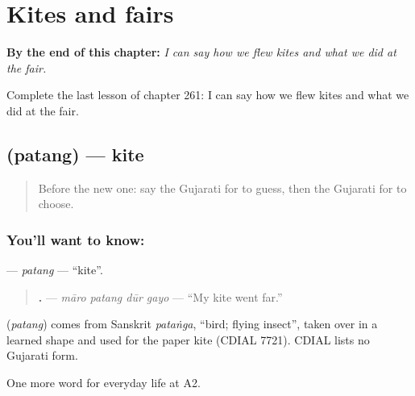 
\chapter{Kites and fairs}
\label{ch:gu-kites-and-fairs}

\begin{chapteropening}
\textbf{By the end of this chapter:} \emph{I can say how we flew kites and what we did at the fair.}

Complete the last lesson of chapter 261: I can say how we flew kites and what we did at the fair.
\end{chapteropening}

\section[\texorpdfstring{\gu{પતંગ} (patang)}{પતંગ (patang)}]{ (patang) — kite}

\label{lesson:GU-C261-patang}



\begin{quote}
Before the new one: say the Gujarati for to guess, then the Gujarati for to choose.
\end{quote}

\subsection*{You'll want to know: }
\textbf{} — \emph{patang} — \textquotedblleft{}kite\textquotedblright{}.

\begin{quote}
\textbf{   .} — \emph{māro patang dūr gayo} — \textquotedblleft{}My kite went far.\textquotedblright{}
\end{quote}

\begin{cousinweb}
\textbf{} (\emph{patang}) comes from Sanskrit \emph{pataṅga}, \textquotedblleft{}bird; flying insect\textquotedblright{}, taken over in a learned shape and used for the paper kite (CDIAL 7721). CDIAL lists no Gujarati form.
\end{cousinweb}

\begin{grammarlens}[title={What you've built}]
One more word for everyday life at A2.
\end{grammarlens}

